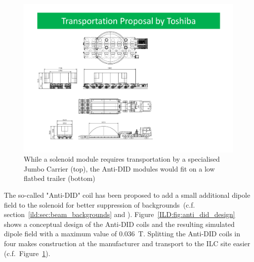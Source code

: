 \begin{figure}[h!]
    \centering
    \includegraphics[width=0.8\hsize]{Integration/fig/Magnet_Transport.pdf}
    \caption{While a solenoid module requires transportation by a specialised Jumbo Carrier (top), the Anti-DID modules would fit on a low flatbed trailer (bottom)~\cite{ild:bib:Solenoid_Manufacturing}}
    \label{ILD:fig:magnet_transport}
\end{figure}

The so-called "Anti-DID" coil has been proposed to add a small additional dipole field to the solenoid for better suppression of backgrounds~(c.f. section~\ref{ild:sec:beam_backgrounds} and \cite{ild:bib:anti-did}). Figure~\ref{ILD:fig:anti_did_design} shows a conceptual design of the Anti-DID coils and the resulting simulated dipole field with a maximum value of 0.036~T. Splitting the Anti-DID coils in four makes construction at the manufacturer and transport to the ILC site easier (c.f.~Figure~\ref{ILD:fig:magnet_transport}).

